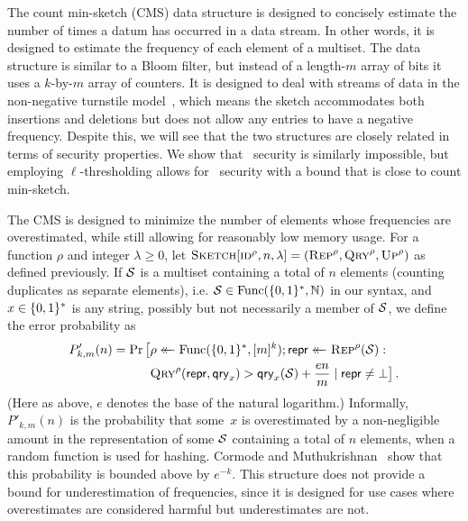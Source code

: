 The count min-sketch (CMS) data structure is designed to concisely estimate the
number of times a datum has occurred in a data stream. In other words, it is
designed to estimate the frequency of each element of a multiset. The data
structure is similar to a Bloom filter, but instead of a length-$m$ array of
bits it uses a $k$-by-$m$ array of counters. It is designed to deal with streams
of data in the non-negative turnstile model~\cite{cormode2005improved}, which
means the sketch accommodates both insertions and deletions but does not allow
any entries to have a negative frequency.
Despite this, we will see that the two structures are closely related in
terms of security properties. We show that \errep\ security is similarly
impossible, but employing $\ell$-thresholding allows for \erreps\ security with a
bound that is close to count min-sketch.

%
The CMS is designed to minimize the number of elements whose
frequencies are overestimated, while still allowing for reasonably low memory
usage. For a function $\rho$ and integer $\lambda\ge0$, let
$\textnormal{\textsc{Sketch}}[\textnormal{\textsc{id}}^\rho,n,\lambda] = (\textnormal{\textsc{Rep}}^\rho,\textnormal{\textsc{Qry}}^\rho,\textnormal{\textsc{Up}}^\rho)$ as defined
previously. If $\mathcal{S}$ is a multiset containing a total of $n$ elements
(counting duplicates as separate elements), i.e. $\mathcal{S} \in \mathrm{Func}(\{0,1\}^*,\mathbb{N})$ in
our syntax, and $x \in \{0,1\}^*$ is any string, possibly but not necessarily a
member of $\mathcal{S}$, we define the error probability as
\begin{equation}\label{eq:bf-fp}
  \begin{aligned}
    P'_{k,m}(n) =
      \Pr\big[&\rho \mathrel{\leftarrow\mkern-14mu\leftarrow} \mathrm{Func}(\{0,1\}^*,[m]^k);
              \mathsf{repr} \mathrel{\leftarrow\mkern-14mu\leftarrow} \textnormal{\textsc{Rep}}^\rho(\mathcal{S}): \\
              &\textnormal{\textsc{Qry}}^\rho(\mathsf{repr}, \mathsf{qry}_x) > \mathsf{qry}_x(\mathcal{S})+\frac{en}{m} \mid \mathsf{repr} \ne \bot
      \big] \,.
  \end{aligned}
\end{equation}
%
(Here as above, $e$ denotes the base of the natural logarithm.)
%
Informally, $P'_{k,m}(n)$ is the probability that some~$x$ is overestimated by a
non-negligible amount in the representation of some $\mathcal{S}$ containing a total
of $n$ elements, when a random function is used for hashing. Cormode and
Muthukrishnan~\cite{cormode2005improved} show that this probability is bounded
above by $e^{-k}$. This structure does not provide a bound for underestimation
of frequencies, since it is designed for use cases where overestimates are
considered harmful but underestimates are not.

